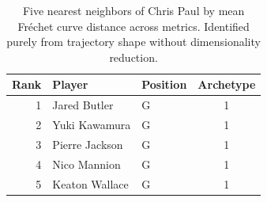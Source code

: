 \begin{table}[htbp]
  \centering\small
  \begin{tabular}{rllc}
    \toprule
    Rank & Player & Position & Archetype \\
    \midrule
    1 & Jared Butler & G & 1 \\
    2 & Yuki Kawamura & G & 1 \\
    3 & Pierre Jackson & G & 1 \\
    4 & Nico Mannion & G & 1 \\
    5 & Keaton Wallace & G & 1 \\
    \bottomrule
  \end{tabular}
  \caption{Five nearest neighbors of Chris Paul by mean Fr\'{e}chet curve distance across metrics. Identified purely from trajectory shape without dimensionality reduction.}
  \label{tab:Chris_Paul_frechet_curve_neighbors}
\end{table}

